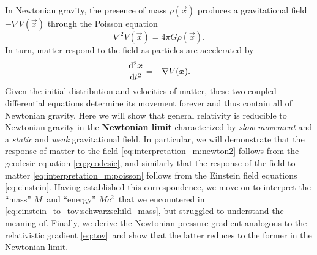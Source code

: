 In Newtonian gravity, the presence of mass $\rho(\vec{x})$ produces a gravitational field $-\nabla V(\vec{x})$ through the Poisson equation
\begin{equation}
	\nabla^2 V(\vec{x}) = 4 \pi G \rho(\vec{x}) .
	\label{eq:interpretation_m:poisson}
\end{equation}
In turn, matter respond to the field as particles are accelerated by
\begin{equation}
	\odv[2]{\vec{x}}{t} = - \nabla V(\vec{x}) .
	\label{eq:interpretation_m:newton2}
\end{equation}
Given the initial distribution and velocities of matter, these two coupled differential equations determine its movement forever and thus contain all of Newtonian gravity.
Here we will show that general relativity is reducible to Newtonian gravity in the \textbf{Newtonian limit} characterized by \emph{slow movement} and a \emph{static} and \emph{weak} gravitational field.
In particular, we will demonstrate that the response of matter to the field \eqref{eq:interpretation_m:newton2} follows from the geodesic equation \eqref{eq:geodesic}, and similarly that the response of the field to matter \eqref{eq:interpretation_m:poisson} follows from the Einstein field equations \eqref{eq:einstein}.
Having established this correspondence, we move on to interpret the ``mass'' $M$ and ``energy'' $Mc^2$ that we encountered in \cref{eq:einstein_to_tov:schwarzschild_mass}, but struggled to understand the meaning of.
Finally, we derive the Newtonian pressure gradient analogous to the relativistic gradient \eqref{eq:tov} and show that the latter reduces to the former in the Newtonian limit.

